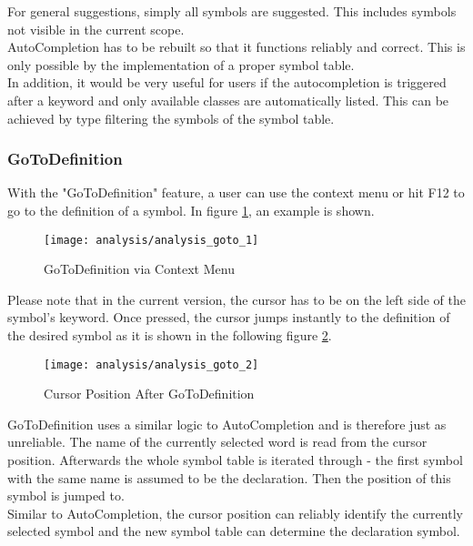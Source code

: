 For general suggestions, simply all symbols are suggested.
This includes symbols not visible in the current scope. \\

AutoCompletion has to be rebuilt so that it functions reliably and correct.
This is only possible by the implementation of a proper symbol table.\\

In addition, it would be very useful for users if the autocompletion is triggered after a 
keyword and only available classes are automatically listed.
This can be achieved by type filtering the symbols of the symbol table.

\subsubsection{GoToDefinition}
With the "GoToDefinition" feature, a user can use the context menu or hit F12 to go to the definition of a symbol.
In figure \ref{fig:analysis_goto_1}, an example is shown.

\begin{figure}[H]
    \centering
    \texttt{[image: analysis/analysis\_goto\_1]}
    \caption{GoToDefinition via Context Menu}
    \label{fig:analysis_goto_1}
\end{figure}

Please note that in the current version, the cursor has to be on the left side of the symbol's keyword.
Once pressed, the cursor jumps instantly to the definition of the desired symbol as it is shown in the following figure \ref{fig:analysis_goto_2}.

\begin{figure}[H]
    \centering
    \texttt{[image: analysis/analysis\_goto\_2]}
    \caption{Cursor Position After GoToDefinition}
    \label{fig:analysis_goto_2}
\end{figure}

GoToDefinition uses a similar logic to AutoCompletion and is therefore just as unreliable.
The name of the currently selected word is read from the cursor position.
Afterwards the whole symbol table is iterated through - the first symbol with the same name is assumed to be the declaration.
Then the position of this symbol is jumped to. \\

Similar to AutoCompletion, the cursor position can reliably identify the currently selected symbol and the new symbol table can determine the declaration symbol.

